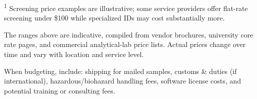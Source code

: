 \documentclass{iopjournal}
\begin{document}
\begin{table}[htbp]
\begin{threeparttable}
\begin{longtable}{@{} L P P P P @{}}
      \bottomrule
    \end{longtable}

    \begin{tablenotes}
      \footnotesize
      \item \textsuperscript{1} Screening price examples are illustrative; some service providers offer flat-rate screening under \$100 while specialized IDs may cost substantially more.
      \item The ranges above are indicative, compiled from vendor brochures, university core rate pages, and commercial analytical-lab price lists. Actual prices change over time and vary with location and service level.
      \item When budgeting, include: shipping for mailed samples, customs \& duties (if international), hazardous/biohazard handling fees, software license costs, and potential training or consulting fees.
    \end{tablenotes}

  \end{threeparttable}
\end{table}

\clearpage

  

\clearpage
\end{document}
